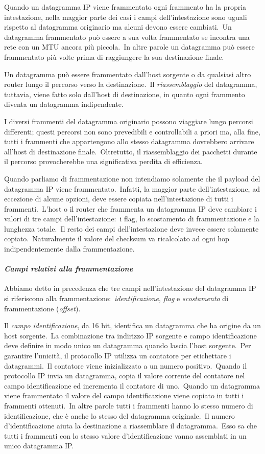 Quando un datagramma IP viene frammentato ogni frammento ha la propria intestazione, nella maggior parte dei casi i campi dell'intestazione sono uguali rispetto al datagramma originario ma alcuni devono essere cambiati.\
Un datagramma frammentato può essere a sua volta frammentato se incontra una rete con un MTU ancora più piccola.\
In altre parole un datagramma può essere frammentato più volte prima di raggiungere la sua destinazione finale.

Un datagramma può essere frammentato dall'host sorgente o da qualsiasi altro router lungo il percorso verso la destinazione.\
Il \emph{riassemblaggio} del datagramma, tuttavia, viene fatto solo dall'host di destinazione, in quanto ogni frammento diventa un datagramma indipendente.

I diversi frammenti del datagramma originario possono viaggiare lungo percorsi differenti; questi percorsi non sono prevedibili e controllabili a priori ma, alla fine, tutti i frammenti che appartengono allo stesso datagramma dovrebbero arrivare all'host di destinazione finale.\
Oltretutto, il riassemblaggio dei pacchetti durante il percorso provocherebbe una significativa perdita di efficienza.

Quando parliamo di frammentazione non intendiamo solamente che il payload del datagramma IP viene frammentato.\
Infatti, la maggior parte dell'intestazione, ad eccezione di alcune opzioni, deve essere copiata nell'intestazione di tutti i frammenti.\
L'host o il router che frammenta un datagramma IP deve cambiare i valori di tre campi dell'intestazione:\ i flag, lo scostamento di frammentazione e la lunghezza totale.\
Il resto dei campi dell'intestazione deve invece essere solamente copiato.\
Naturalmente il valore del checksum va ricalcolato ad ogni hop indipendentemente dalla frammentazione.

\paragraph{\emph{Campi relativi alla frammentazione}}
Abbiamo detto in precedenza che tre campi nell'intestazione del datagramma IP si riferiscono alla frammentazione:\ \emph{identificazione}, \emph{flag} e \emph{scostamento} di frammentazione (\emph{offset}).

Il \emph{campo identificazione}, da 16 bit, identifica un datagramma che ha origine da un host sorgente.\
La combinazione tra indirizzo IP sorgente e campo identificazione deve definire in modo unico un datagramma quando lascia l'host sorgente.\
Per garantire l'unicità, il protocollo IP utilizza un contatore per etichettare i datagrammi.\
Il contatore viene inizializzato a un numero positivo.\
Quando il protocollo IP invia un datagramma, copia il valore corrente del contatore nel campo identificazione ed incrementa il contatore di uno.\
Quando un datagramma viene frammentato il valore del campo identificazione viene copiato in tutti i frammenti ottenuti.\
In altre parole tutti i frammenti hanno lo stesso numero di identificazione, che è anche lo stesso del datagramma originale.\
Il numero d'identificazione aiuta la destinazione a riassemblare il datagramma.\
Esso sa che tutti i frammenti con lo stesso valore d'identificazione vanno assemblati in un unico datagramma IP.

